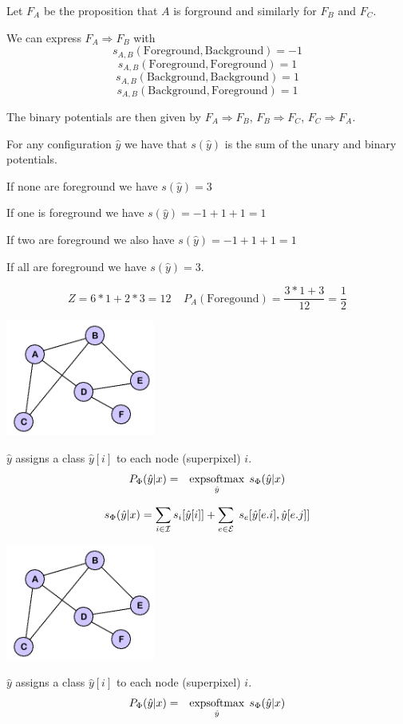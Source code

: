 {


\vfill
Let $F_A$ be the proposition that $A$ is forground and similarly for $F_B$ and $F_C$.

\vfill
We can express $F_A \Rightarrow F_B$ with
$$s_{A,B}(\mathrm{Foreground},\mathrm{Background}) = -1$$
$$s_{A,B}(\mathrm{Foreground},\mathrm{Foreground}) = 1$$
$$s_{A,B}(\mathrm{Background},\mathrm{Background}) = 1$$
$$s_{A,B}(\mathrm{Background},\mathrm{Foreground}) = 1$$

\vfill
The binary potentials are then given by
$F_A \Rightarrow F_B$, $F_B \Rightarrow F_C$, $F_C \Rightarrow F_A$.


For any configuration $\hat{y}$ we have that $s(\hat{y})$ is the sum of the unary and binary potentials.

\vfill
If none are foreground we have $s(\hat{y}) = 3$

\vfill
If one is foreground we have $s(\hat{y}) = -1 + 1+ 1 = 1$

\vfill
If two are foreground we also have $s(\hat{y}) = -1 + 1+ 1 = 1$

\vfill
If all are foreground we have $s(\hat{y}) = 3$.

\vfill
$$Z = 6*1 + 2*3 = 12\;\;\;\;P_A(\mathrm{Foregound}) = \frac{3*1 + 3}{12} = \frac{1}{2}$$

\bigskip
\centerline{\includegraphics[height= 1.5in]{../images/Graph}}
\medskip
$\hat{y} $ assigns a class $\hat{y}[i]$ to each node (superpixel) $i$.
\bigskip
\bigskip
{\color{red}
\begin{eqnarray*}
P_\Phi(\hat{y}|x) & = & \operatorname*{expsoftmax}_{\hat{y}}\;s_\Phi(\hat{y}|x)
\end{eqnarray*}
}

\vfill
{\color{red} $$s_\Phi(\hat{y}|x) = \sum_{i \in {\cal I}} s_i[\hat{y}[i]] + \sum_{e \in {\cal E}}\;s_e[\hat{y}[e.i],\hat{y}[e.j]]$$}

\bigskip
\centerline{\includegraphics[height= 1.5in]{../images/Graph}}
\medskip
$\hat{y} $ assigns a class $\hat{y}[i]$ to each node (superpixel) $i$.
\bigskip
\bigskip
{\color{red}
\begin{eqnarray*}
P_\Phi(\hat{y}|x) & = & \operatorname*{expsoftmax}_{\hat{y}}\;s_\Phi(\hat{y}|x)
\end{eqnarray*}
}

}
